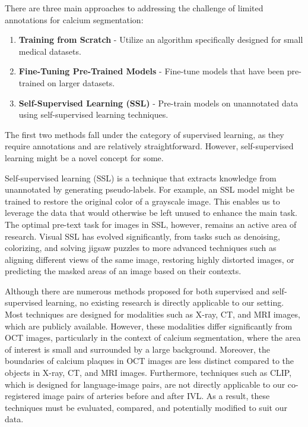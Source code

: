\documentclass[a4paper,11pt,oneside]{report}
\begin{document}
There are three main approaches to addressing the challenge of limited annotations for calcium segmentation: 
\begin{enumerate}
    \item \textbf{Training from Scratch} - Utilize an algorithm specifically designed for small medical datasets.
    \item \textbf{Fine-Tuning Pre-Trained Models} - Fine-tune models that have been pre-trained on larger datasets.
    \item \textbf{Self-Supervised Learning (SSL)} - Pre-train models on unannotated data using self-supervised learning techniques.
\end{enumerate}
The first two methods fall under the category of supervised learning, as they require annotations and are relatively straightforward. However, self-supervised learning might be a novel concept for some.

Self-supervised learning (SSL) is a technique that extracts knowledge from unannotated by generating pseudo-labels. For example, an SSL model might be trained to restore the original color of a grayscale image. This enables us to leverage the data that would otherwise be left unused to enhance the main task. The optimal pre-text task for images in SSL, however, remains an active area of research. Visual SSL has evolved significantly, from tasks such as denoising, colorizing, and solving jigsaw puzzles to more advanced techniques such as aligning different views of the same image, restoring highly distorted images, or predicting the masked areas of an image based on their contexts. 

Although there are numerous methods proposed for both supervised and self-supervised learning, no existing research is directly applicable to our setting. Most techniques are designed for modalities such as X-ray, CT, and MRI images, which are publicly available. However, these modalities differ significantly from OCT images, particularly in the context of calcium segmentation, where the area of interest is small and surrounded by a large background. Moreover, the boundaries of calcium plaques in OCT images are less distinct compared to the objects in X-ray, CT, and MRI images. Furthermore, techniques such as CLIP, which is designed for language-image pairs, are not directly applicable to our co-registered image pairs of arteries before and after IVL. As a result, these techniques must be evaluated, compared, and potentially modified to suit our data. 
\end{document}
